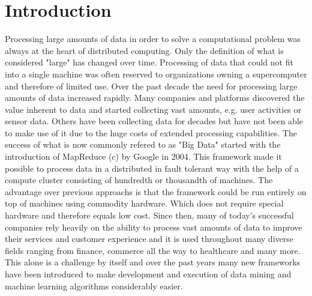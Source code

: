 \chapter{Introduction}
Processing large amounts of data in order to solve a computational problem was always at the heart of distributed computing. Only the definition of what is considered "large" has changed over time. Processing of data that could not fit into a single machine was often reserved to organizations owning a supercomputer and therefore of limited use. Over the past decade the need for processing large amounts of data increased rapidly. Many companies and platforms discovered the value inherent to data and started collecting vast amounts, e.g. user activities or sensor data. Others have been collecting data for decades but have not been able to make use of it due to the huge costs of extended processing capabilities. The success of what is now commonly refered to as "Big Data" started with the introduction of MapReduce (c) by Google in 2004. This framework made it possible to process data in a distributed in fault tolerant way with the help of a compute cluster consisting of hundredth or thousandth of machines. The advantage over previous approachs is that the framework could be run entirely on top of machines using commodity hardware. Which does not require special hardware and therefore equals low cost. Since then, many of today's successful companies rely heavily on the ability to process vast amounts of data to improve their services and customer experience and it is used throughout many diverse fields ranging from finance, commerce all the way to healthcare and many more. This alone is a challenge by itself and over the past years many new frameworks have been introduced to make development and execution of data mining and machine learning algorithms considerably easier.

